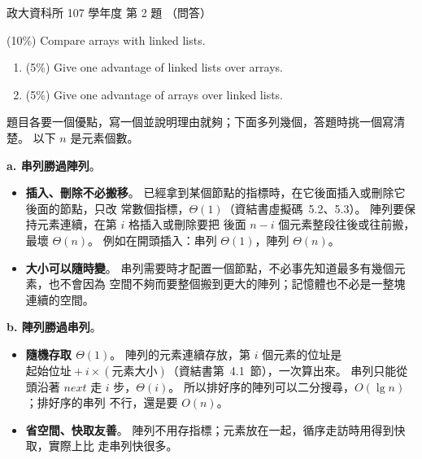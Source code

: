 \begin{pastexam}[label={px:nccu-107-dsa-02}]{政大資科所 107 學年度 第 2 題}
（問答）

(10\%) Compare arrays with linked lists.
\begin{enumerate}[label=\alph*.]
\item (5\%) Give one advantage of linked lists over arrays.
\item (5\%) Give one advantage of arrays over linked lists.
\end{enumerate}
\end{pastexam}

\begin{pastsoln}
題目各要一個優點，寫一個並說明理由就夠；下面多列幾個，答題時挑一個寫清楚。 以下 $n$ 是元素個數。

\textbf{a. 串列勝過陣列}。
\begin{itemize}
\item \textbf{插入、刪除不必搬移}。 已經拿到某個節點的指標時，在它後面插入或刪除它後面的節點，只改
常數個指標，$\Theta(1)$（資結書虛擬碼~5.2、5.3）。 陣列要保持元素連續，在第 $i$ 格插入或刪除要把
後面 $n - i$ 個元素整段往後或往前搬，最壞 $\Theta(n)$。 例如在開頭插入：串列 $\Theta(1)$，陣列
$\Theta(n)$。
\item \textbf{大小可以隨時變}。 串列需要時才配置一個節點，不必事先知道最多有幾個元素，也不會因為
空間不夠而要整個搬到更大的陣列；記憶體也不必是一整塊連續的空間。
\end{itemize}

\textbf{b. 陣列勝過串列}。
\begin{itemize}
\item \textbf{隨機存取 $\Theta(1)$}。 陣列的元素連續存放，第 $i$ 個元素的位址是
$\text{起始位址} + i \times (\text{元素大小})$（資結書第~4.1~節），一次算出來。 串列只能從頭沿著
$\mathit{next}$ 走 $i$ 步，$\Theta(i)$。 所以排好序的陣列可以二分搜尋，$O(\lg n)$；排好序的串列
不行，還是要 $O(n)$。
\item \textbf{省空間、快取友善}。 陣列不用存指標；元素放在一起，循序走訪時用得到快取，實際上比
走串列快很多。
\end{itemize}
\end{pastsoln}
